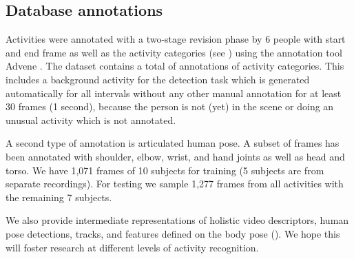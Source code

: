 \subsection{Database annotations}
\label{sec:cvpr12:db:annos}

Activities were annotated with a two-stage revision phase by 6 people with start and end frame as well as the activity categories (see ) using the annotation tool Advene \citep{aubert07mm}. 
The dataset contains a total of \DBnAnnos annotations of \DBnActivities activity categories. This includes a background activity for the detection task which is  generated automatically for all intervals without any other manual annotation for at least 30 frames (1 second), \eg because the person is not (yet) in the scene or doing an unusual activity which is not annotated.

A second type of annotation is articulated human pose. 
A subset of frames has been annotated with shoulder, elbow, wrist, and hand joints as well as head and torso.
We have 1,071 frames of 10 subjects for training (5 subjects are from separate recordings). For testing we sample 1,277 frames from all activities with the remaining 7 subjects.

We also provide intermediate representations of holistic video descriptors, human pose detections, tracks, and features defined on the body pose (). We hope this will foster research at different levels of activity recognition.

